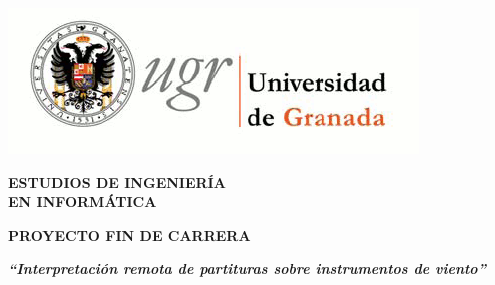 
 \setcounter{page}{1}

\thispagestyle{empty}
%

\newpage

\thispagestyle{empty}

\begin{center}
\textbf{\huge \includegraphics[scale=0.2]{logo_ugr}}
\par\end{center}{\huge \par}

\begin{center}
\vspace*{1cm} 
\par\end{center}

\begin{center}
\textbf{\large ESTUDIOS DE INGENIERÍA }\\
\textbf{\large EN INFORMÁTICA}
\par\end{center}{\large \par}

\begin{center}
\textbf{\large PROYECTO FIN DE CARRERA}
\par\end{center}{\large \par}

\begin{center}

\par\end{center}

\begin{center}
\textbf{\emph{\LARGE {}``Interpretación remota de partituras sobre instrumentos de viento''}}
\par\end{center}{\LARGE \par}

